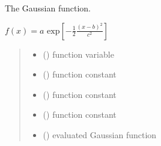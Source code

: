 \documentclass[letterpaper,10pt,english]{sphinxmanual}
\begin{document}

\begin{fulllineitems}
\label{\detokenize{01_utils:skinoptics.utils.gaussian}}
\pysigstartsignatures
{}
\pysigstopsignatures
\sphinxAtStartPar
The Gaussian function.

\sphinxAtStartPar
\(f(x) = a \mbox{ exp}\left[-\frac{1}{2}\frac{(x - b)^2}{c^2}\right]\)
\begin{quote}\begin{description}
\begin{itemize}
\item {} 
\sphinxAtStartPar
{} () \textendash{} function variable

\item {} 
\sphinxAtStartPar
{} () \textendash{} function constant

\item {} 
\sphinxAtStartPar
{} () \textendash{} function constant

\item {} 
\sphinxAtStartPar
{} () \textendash{} function constant

\end{itemize}

\sphinxAtStartPar
\begin{itemize}
\item {} 
\sphinxAtStartPar
{} () \textendash{} evaluated Gaussian function

\end{itemize}


\end{description}\end{quote}

\end{fulllineitems}
\end{document}
